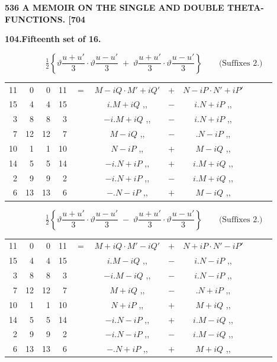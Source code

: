 \documentclass[11pt]{article}
\newcommand{\half}{\tfrac{1}{2}}
\begin{document}
\newpage
\noindent\textbf{536 \hfill A MEMOIR ON THE SINGLE AND DOUBLE THETA-FUNCTIONS. \hfill [704}

\medskip
\begin{center}\textbf{104.\quad Fifteenth set of 16.}\end{center}

\[
\half\!\left\{\vartheta\frac{u+u'}{3}\cdot\vartheta\frac{u-u'}{3}\;+\;\vartheta\frac{u+u'}{3}\cdot\vartheta\frac{u-u'}{3}\right\}\qquad\text{(Suffixes 2.)}
\]
{\small
\begin{center}
\begin{tabular}{rrrrr@{\ }c@{\ }lcr@{\ }c@{\ }l}
11 & 0  & 0  & 11 & $=$ & $M-iQ\cdot M'+iQ'$ & $+$ & $N-iP\cdot N'+iP'$ \\
15 & 4  & 4  & 15 & & $i.M+iQ$ \quad ,, & $-$ & $i.N+iP$ \quad ,, \\
3  & 8  & 8  & 3  & & $-i.M+iQ$ \quad ,, & $-$ & $i.N+iP$ \quad ,, \\
7  & 12 & 12 & 7  & & $M-iQ$ \quad ,, & $-$ & $.N-iP$ \quad ,, \\
10 & 1  & 1  & 10 & & $N-iP$ \quad ,, & $+$ & $M-iQ$ \quad ,, \\
14 & 5  & 5  & 14 & & $-i.N+iP$ \quad ,, & $+$ & $i.M+iQ$ \quad ,, \\
2  & 9  & 9  & 2  & & $-i.N+iP$ \quad ,, & $-$ & $i.M+iQ$ \quad ,, \\
6  & 13 & 13 & 6  & & $-.N-iP$ \quad ,, & $+$ & $M-iQ$ \quad ,, \\
\end{tabular}
\end{center}
}

\[
\half\!\left\{\vartheta\frac{u+u'}{3}\cdot\vartheta\frac{u-u'}{3}\;-\;\vartheta\frac{u+u'}{3}\cdot\vartheta\frac{u-u'}{3}\right\}\qquad\text{(Suffixes 2.)}
\]
{\small
\begin{center}
\begin{tabular}{rrrrr@{\ }c@{\ }lcr@{\ }c@{\ }l}
11 & 0  & 0  & 11 & $=$ & $M+iQ\cdot M'-iQ'$ & $+$ & $N+iP\cdot N'-iP'$ \\
15 & 4  & 4  & 15 & & $i.M-iQ$ \quad ,, & $-$ & $i.N-iP$ \quad ,, \\
3  & 8  & 8  & 3  & & $-i.M-iQ$ \quad ,, & $-$ & $i.N-iP$ \quad ,, \\
7  & 12 & 12 & 7  & & $M+iQ$ \quad ,, & $-$ & $.N+iP$ \quad ,, \\
10 & 1  & 1  & 10 & & $N+iP$ \quad ,, & $+$ & $M+iQ$ \quad ,, \\
14 & 5  & 5  & 14 & & $-i.N-iP$ \quad ,, & $+$ & $i.M-iQ$ \quad ,, \\
2  & 9  & 9  & 2  & & $-i.N-iP$ \quad ,, & $-$ & $i.M-iQ$ \quad ,, \\
6  & 13 & 13 & 6  & & $-.N+iP$ \quad ,, & $+$ & $M+iQ$ \quad ,, \\
\end{tabular}
\end{center}
}
\end{document}
